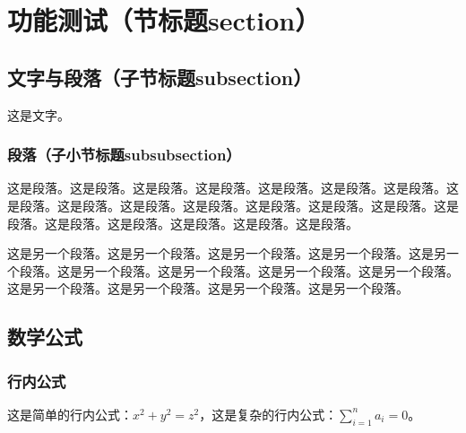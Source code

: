 \documentclass[UTF8, zihao = -4, linespread = 1.335, heading = true, fontset = none]{ctexart}
\begin{document}





\transbody
\setfancylength
\pagestyle{ujntranslation}


\section{功能测试（节标题section）}
\subsection{文字与段落（子节标题subsection）}
这是文字。
\subsubsection{段落（子小节标题subsubsection）}
这是段落。这是段落。这是段落。这是段落。这是段落。这是段落。这是段落。这是段落。这是段落。这是段落。这是段落。这是段落。这是段落。这是段落。这是段落。这是段落。这是段落。这是段落。这是段落。这是段落。

这是另一个段落。这是另一个段落。这是另一个段落。这是另一个段落。这是另一个段落。这是另一个段落。这是另一个段落。这是另一个段落。这是另一个段落。这是另一个段落。这是另一个段落。这是另一个段落。这是另一个段落。
\subsection{数学公式}
\subsubsection{行内公式}
这是简单的行内公式：$x^2+y^2=z^2$，这是复杂的行内公式：$\sum_{i=1}^n a_i=0$。
\end{document}
